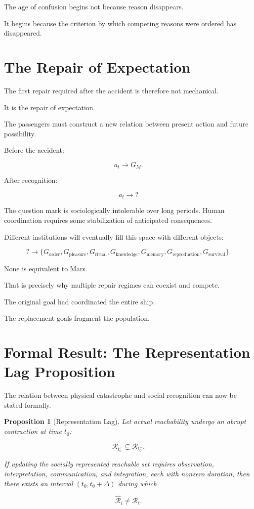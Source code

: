 \documentclass[11pt,oneside]{book}
\newtheorem{proposition}[theorem]{Proposition}
\theoremstyle{definition}
\theoremstyle{remark}
\newcommand{\R}{\mathcal{R}}
\begin{document}
The age of confusion begins not because reason disappears.

It begins because the criterion by which competing reasons were ordered has disappeared.

\section{The Repair of Expectation}

The first repair required after the accident is therefore not mechanical.

It is the repair of expectation.

The passengers must construct a new relation between present action and future possibility.

Before the accident:

\[
a_t
\rightarrow
G_M.
\]

After recognition:

\[
a_t
\rightarrow
?
\]

The question mark is sociologically intolerable over long periods. Human coordination requires some stabilization of anticipated consequences.

Different institutions will eventually fill this space with different objects:

\[
?
\rightarrow
\{
G_{\mathrm{order}},
G_{\mathrm{pleasure}},
G_{\mathrm{ritual}},
G_{\mathrm{knowledge}},
G_{\mathrm{memory}},
G_{\mathrm{reproduction}},
G_{\mathrm{survival}}
\}.
\]

None is equivalent to Mars.

That is precisely why multiple repair regimes can coexist and compete.

The original goal had coordinated the entire ship.

The replacement goals fragment the population.

\section{Formal Result: The Representation Lag Proposition}

The relation between physical catastrophe and social recognition can now be stated formally.

\begin{proposition}[Representation Lag]
Let actual reachability undergo an abrupt contraction at time \(t_0\):

\[
\R_{t_0^+}\subsetneq\R_{t_0^-}.
\]

If updating the socially represented reachable set requires observation, interpretation, communication, and integration, each with nonzero duration, then there exists an interval \((t_0,t_0+\Delta)\) during which

\[
\widehat{\R}_t\neq\R_t.
\]
\end{proposition}
\end{document}
